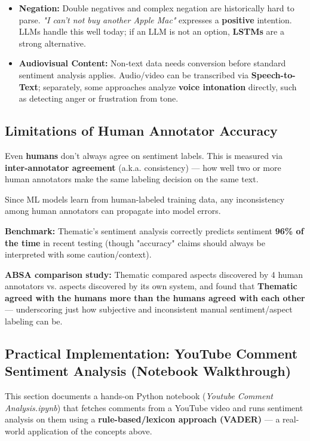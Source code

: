 \documentclass[12pt,openany]{book}
\begin{document}
\begin{itemize}[leftmargin=*]
    \item \textbf{Negation:} Double negatives and complex negation are historically hard to parse. \textit{"I can't not buy another Apple Mac"} expresses a \textbf{positive} intention. LLMs handle this well today; if an LLM is not an option, \textbf{LSTMs} are a strong alternative.
    \item \textbf{Audiovisual Content:} Non-text data needs conversion before standard sentiment analysis applies. Audio/video can be transcribed via \textbf{Speech-to-Text}; separately, some approaches analyze \textbf{voice intonation} directly, such as detecting anger or frustration from tone.
\end{itemize}

\subsection{Limitations of Human Annotator Accuracy}

Even \textbf{humans} don't always agree on sentiment labels. This is measured via \textbf{inter-annotator agreement} (a.k.a. consistency) --- how well two or more human annotators make the same labeling decision on the same text.

Since ML models learn from human-labeled training data, any inconsistency among human annotators can propagate into model errors.

\textbf{Benchmark:} Thematic's sentiment analysis correctly predicts sentiment \textbf{96\% of the time} in recent testing (though "accuracy" claims should always be interpreted with some caution/context).

\textbf{ABSA comparison study:} Thematic compared aspects discovered by 4 human annotators vs. aspects discovered by its own system, and found that \textbf{Thematic agreed with the humans more than the humans agreed with each other} --- underscoring just how subjective and inconsistent manual sentiment/aspect labeling can be.

\subsection{Practical Implementation: YouTube Comment Sentiment Analysis (Notebook Walkthrough)}

This section documents a hands-on Python notebook (\textit{Youtube Comment Analysis.ipynb}) that fetches comments from a YouTube video and runs sentiment analysis on them using a \textbf{rule-based/lexicon approach (VADER)} --- a real-world application of the concepts above.
\end{document}
